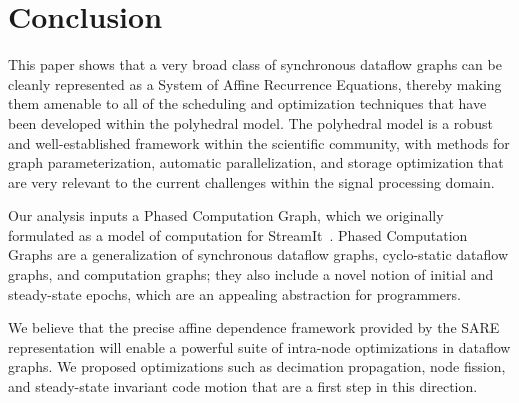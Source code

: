 \section{Conclusion}

This paper shows that a very broad class of synchronous dataflow
graphs can be cleanly represented as a System of Affine Recurrence
Equations, thereby making them amenable to all of the scheduling and
optimization techniques that have been developed within the polyhedral
model.  The polyhedral model is a robust and well-established
framework within the scientific community, with methods for graph
parameterization, automatic parallelization, and storage optimization
that are very relevant to the current challenges within the signal
processing domain.  

Our analysis inputs a Phased Computation Graph, which we originally
formulated as a model of computation for StreamIt~\cite{streamitcc}.
Phased Computation Graphs are a generalization of synchronous dataflow
graphs, cyclo-static dataflow graphs, and computation graphs; they
also include a novel notion of initial and steady-state epochs, which
are an appealing abstraction for programmers.

We believe that the precise affine dependence framework provided by
the SARE representation will enable a powerful suite of intra-node
optimizations in dataflow graphs.  We proposed optimizations such as
decimation propagation, node fission, and steady-state invariant code
motion that are a first step in this direction.
